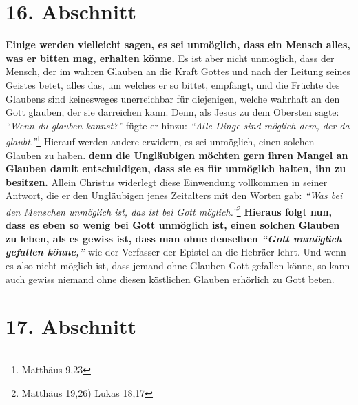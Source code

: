\section{16. Abschnitt} \label{kap6_ab16}

\label{ref:06_14_gebetserfuellung}
\textbf{Einige werden vielleicht sagen, es sei unmöglich, dass ein Mensch alles,
was er
bitten mag, erhalten könne.} Es ist aber nicht unmöglich, dass der Mensch, der
im
wahren Glauben an die Kraft Gottes und nach der Leitung seines Geistes betet,
alles das, um welches er so bittet, empfängt, und die Früchte des Glaubens sind
keinesweges unerreichbar für diejenigen, welche wahrhaft an den Gott glauben,
der sie darreichen kann. Denn, als Jesus zu dem Obersten sagte:
\textit{"`Wenn du glauben kannst?"'} fügte er hinzu: \textit{"`Alle Dinge sind
möglich dem, der da glaubt."'}\footnote{Matthäus 9,23}
Hierauf werden andere erwidern, es sei
unmöglich, einen solchen Glauben zu haben. \textbf{denn die Ungläubigen möchten
gern
ihren Mangel an Glauben  damit entschuldigen, dass
sie es für unmöglich halten,
ihn zu besitzen.} Allein Christus widerlegt diese Einwendung vollkommen in
seiner
Antwort, die er den Ungläubigen jenes Zeitalters mit den Worten gab:
\textit{"`Was bei den Menschen unmöglich ist, das ist bei Gott
möglich."'}\footnote{Matthäus 19,26) Lukas 18,17}
\textbf{Hieraus folgt nun, dass es eben so wenig bei Gott unmöglich
ist,
einen solchen Glauben zu leben, als es gewiss ist, dass man ohne denselben
\textit{"`Gott unmöglich gefallen könne,"'}} wie der Verfasser der Epistel an
die Hebräer
lehrt. Und wenn es also nicht möglich ist, dass jemand ohne Glauben Gott
gefallen könne, so kann auch gewiss niemand ohne diesen köstlichen Glauben
erhörlich zu Gott beten.

\section{17. Abschnitt} \label{kap6_ab17}

